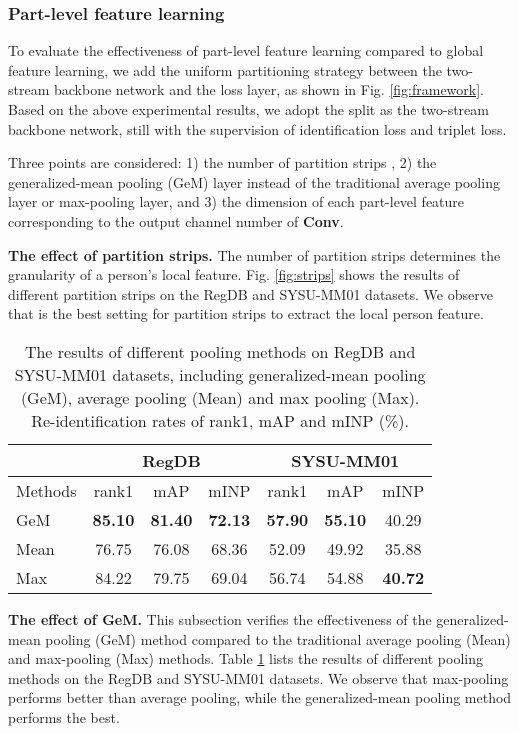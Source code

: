 \documentclass[journal]{IEEEtran}
\begin{document}
\subsubsection{Part-level feature learning}
\label{sssec:pfl}
To evaluate the effectiveness of part-level feature learning compared to global feature learning, we add the uniform partitioning strategy between the two-stream backbone network and the loss layer, as shown in Fig. \ref{fig:framework}.
Based on the above experimental results, we adopt the  split as the two-stream backbone network, still with the supervision of identification loss and triplet loss.

Three points are considered: 1) the number of partition strips , 2) the generalized-mean pooling (GeM) layer instead of the traditional average pooling layer or max-pooling layer, and 3) the dimension of each part-level feature  corresponding to the output channel number of  \textbf{Conv}.


\textbf{The effect of partition strips.} The number of partition strips determines the granularity of a person's local feature. Fig. \ref{fig:strips} shows the results of different partition strips  on the RegDB and SYSU-MM01 datasets. We observe that  is the best setting for partition strips to extract the local person feature.


\begin{table}
\caption{The results of different pooling methods on RegDB and SYSU-MM01 datasets, including generalized-mean pooling (GeM), average pooling (Mean) and max pooling (Max). Re-identification rates of rank1, mAP and mINP (\%).}
\label{tab:pool}
  \centering
\begin{tabular}{l|c|c|c|c|c|c}
   \toprule[2pt]
    & \multicolumn{3}{c|}{RegDB} & \multicolumn{3}{c}{SYSU-MM01}\\ \hline
    Methods & rank1 & mAP & mINP & rank1 & mAP & mINP \\ \toprule[1pt]
    GeM & \textbf{85.10} & \textbf{81.40} & \textbf{72.13} & \textbf{57.90} & \textbf{55.10} & 40.29 \\
    Mean &  76.75 & 76.08 & 68.36 & 52.09 & 49.92 & 35.88 \\
    Max & 84.22 & 79.75 & 69.04 & 56.74 & 54.88 & \textbf{40.72} \\ \toprule[2pt]
  \end{tabular}
\end{table}

\textbf{The effect of GeM.} This subsection verifies the effectiveness of the generalized-mean pooling (GeM) method compared to the traditional average pooling (Mean) and max-pooling (Max) methods. Table \ref{tab:pool} lists the results of different pooling methods on the RegDB and SYSU-MM01 datasets. We observe that max-pooling performs better than average pooling, while the generalized-mean pooling method performs the best.
\end{document}
